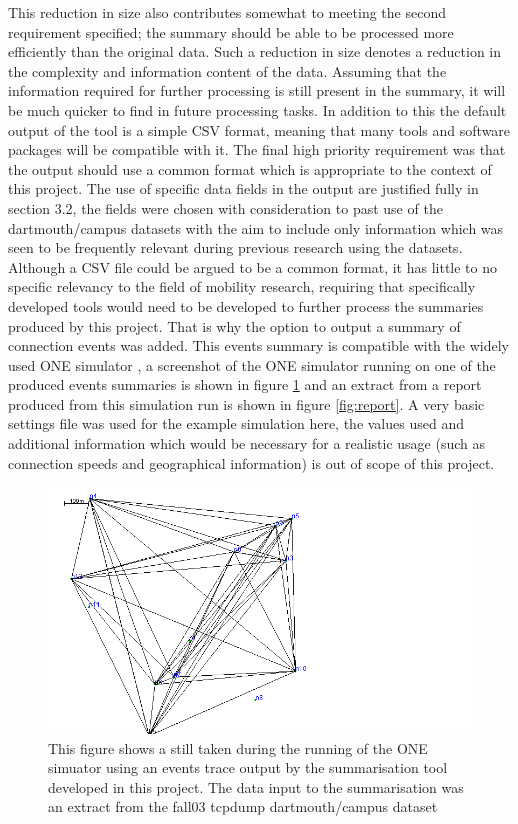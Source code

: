 This reduction in size also contributes somewhat to meeting the second requirement specified; the summary should be able to be processed more efficiently than the original data. Such a reduction in size denotes a reduction in the complexity and information content of the data. Assuming that the information required for further processing is still present in the summary, it will be much quicker to find in future processing tasks. In addition to this the default output of the tool is a simple CSV format, meaning that many tools and software packages will be compatible with it.
The final high priority requirement was that the output should use a common format which is appropriate to the context of this project. The use of specific data fields in the output are justified fully in section 3.2, the fields were chosen with consideration to past use of the dartmouth/campus datasets with the aim to include only information which was seen to be frequently relevant during previous research using the datasets. Although a CSV file could be argued to be a common format, it has little to no specific relevancy to the field of mobility research, requiring that specifically developed tools would need to be developed to further process the summaries produced by this project. That is why the option to output a summary of connection events was added. This events summary is compatible with the widely used ONE simulator \cite{Keranen2009}, a screenshot of the ONE simulator running on one of the produced events summaries is shown in figure \ref{fig:one} and an extract from a report produced from this simulation run is shown in figure \ref{fig:report}. A very basic settings file was used for the example simulation here, the values used and additional information which would be necessary for a realistic usage (such as connection speeds and geographical information) is out of scope of this project.
\begin{figure}[h]
    \centering
    \includegraphics[width=\textwidth]{screenshot_one.png}
    \caption{This figure shows a still taken during the running of the ONE simuator using an events trace output by the summarisation tool developed in this project. The data input to the summarisation was an extract from the fall03 tcpdump dartmouth/campus \cite{dartmouthcampus2009} dataset}
    \label{fig:one}
\end{figure}
